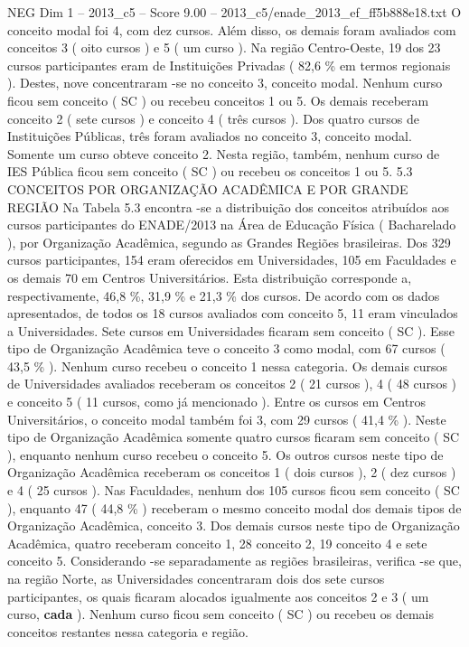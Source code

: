 \begin{textsample}{NEG Dim 1 – 2013\_c5 – Score 9.00 – 2013\_c5/enade\_2013\_ef\_ff5b888e18.txt}
O conceito modal foi 4, com dez cursos.
Além disso, os demais foram avaliados com conceitos 3 ( oito cursos ) e 5 ( um curso ).
Na região Centro-Oeste, 19 dos 23 cursos participantes eram de Instituições Privadas ( 82,6 \% em termos regionais ).
Destes, nove concentraram -se no conceito 3, conceito modal.
Nenhum curso ficou sem conceito ( SC ) ou recebeu conceitos 1 ou 5.
Os demais receberam conceito 2 ( sete cursos ) e conceito 4 ( três cursos ).
Dos quatro cursos de Instituições Públicas, três foram avaliados no conceito 3, conceito modal.
Somente um curso obteve conceito 2.
Nesta região, também, nenhum curso de IES Pública ficou sem conceito ( SC ) ou recebeu os conceitos 1 ou 5. 5.3 CONCEITOS POR ORGANIZAÇÃO ACADÊMICA E POR GRANDE REGIÃO Na Tabela 5.3 encontra -se a distribuição dos conceitos atribuídos aos cursos participantes do ENADE/2013 na Área de Educação Física ( Bacharelado ), por Organização Acadêmica, segundo as Grandes Regiões brasileiras.
Dos 329 cursos participantes, 154 eram oferecidos em Universidades, 105 em Faculdades e os demais 70 em Centros Universitários.
Esta distribuição corresponde a, respectivamente, 46,8 \%, 31,9 \% e 21,3 \% dos cursos.
De acordo com os dados apresentados, de todos os 18 cursos avaliados com conceito 5, 11 eram vinculados a Universidades.
Sete cursos em Universidades ficaram sem conceito ( SC ).
Esse tipo de Organização Acadêmica teve o conceito 3 como modal, com 67 cursos ( 43,5 \% ).
Nenhum curso recebeu o conceito 1 nessa categoria.
Os demais cursos de Universidades avaliados receberam os conceitos 2 ( 21 cursos ), 4 ( 48 cursos ) e conceito 5 ( 11 cursos, como já mencionado ).
Entre os cursos em Centros Universitários, o conceito modal também foi 3, com 29 cursos ( 41,4 \% ).
Neste tipo de Organização Acadêmica somente quatro cursos ficaram sem conceito ( SC ), enquanto nenhum curso recebeu o conceito 5.
Os outros cursos neste tipo de Organização Acadêmica receberam os conceitos 1 ( dois cursos ), 2 ( dez cursos ) e 4 ( 25 cursos ).
Nas Faculdades, nenhum dos 105 cursos ficou sem conceito ( SC ), enquanto 47 ( 44,8 \% ) receberam o mesmo conceito modal dos demais tipos de Organização Acadêmica, conceito 3.
Dos demais cursos neste tipo de Organização Acadêmica, quatro receberam conceito 1, 28 conceito 2, 19 conceito 4 e sete conceito 5.
Considerando -se separadamente as regiões brasileiras, verifica -se que, na região Norte, as Universidades concentraram dois dos sete cursos participantes, os quais ficaram alocados igualmente aos conceitos 2 e 3 ( um curso, \textbf{cada} ).
Nenhum curso ficou sem conceito ( SC ) ou recebeu os demais conceitos restantes nessa categoria e região.

\end{textsample}
